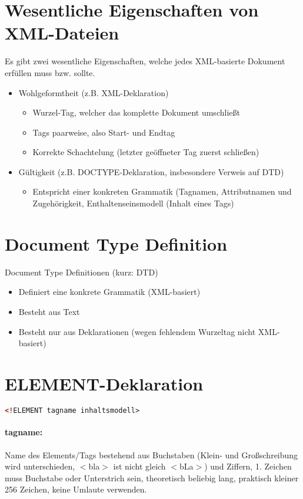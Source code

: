 \section{Wesentliche Eigenschaften von XML-Dateien}
Es gibt zwei wesentliche Eigenschaften, welche jedes XML-basierte Dokument erfüllen muss bzw. sollte.
\begin{itemize}
\item Wohlgeformtheit (z.B. XML-Deklaration)
  \begin{itemize}
  \item Wurzel-Tag, welcher das komplette Dokument umschließt
  \item Tags paarweise, also Start- und Endtag
  \item Korrekte Schachtelung (letzter geöffneter Tag zuerst schließen)
  \end{itemize}
\item Gültigkeit (z.B. DOCTYPE-Deklaration, insbesondere Verweis auf DTD)
  \begin{itemize}
  \item Entspricht einer konkreten Grammatik (Tagnamen, Attributnamen und Zugehörigkeit, Enthaltenseinsmodell  (Inhalt eines Tags)
  \end{itemize}
\end{itemize}


\section{Document Type Definition}
Document Type Definitionen (kurz: DTD)
\begin{itemize}
\item Definiert eine konkrete Grammatik (XML-basiert)
\item Besteht aus Text
\item Besteht nur aus Deklarationen (wegen fehlendem Wurzeltag nicht XML-basiert)
\end{itemize}

\newpage
\section{ELEMENT-Deklaration}
\begin{lstlisting}[caption={Syntax einer ELEMENT-Deklaration}, label={lst:doctype-declaration}, language={XML}]
  <!ELEMENT tagname inhaltsmodell>
\end{lstlisting}
\paragraph{tagname:}Name des Elements/Tags bestehend aus Buchstaben (Klein- und Großschreibung wird unterschieden, $<$bla$>$ ist nicht gleich $<$bLa$>$) und Ziffern, 1. Zeichen muss Buchstabe oder Unterstrich sein, theoretisch beliebig lang, praktisch kleiner 256 Zeichen, keine Umlaute verwenden.
